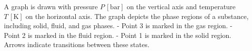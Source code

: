 A graph is drawn with pressure \( P \, [\text{bar}] \) on the vertical axis and temperature \( T \, [\text{K}] \) on the horizontal axis. The graph depicts the phase regions of a substance, including solid, fluid, and gas phases.  
- Point 3 is marked in the gas region.  
- Point 2 is marked in the fluid region.  
- Point 1 is marked in the solid region.  
Arrows indicate transitions between these states.